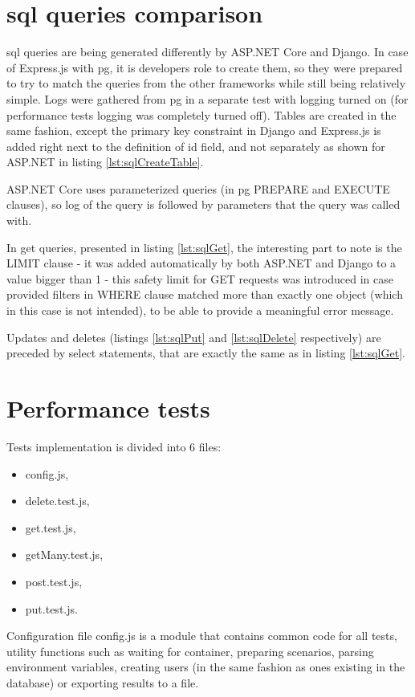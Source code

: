 %
%
\section{\acrshort{sql} queries comparison}
\acrshort{sql} queries are being generated differently by ASP.NET Core and Django. In case of Express.js with \acrlong{pg}, it is developers role to create them, so they were prepared to try to match the queries from the other frameworks while still being relatively simple. Logs were gathered from \acrlong{pg} in a separate test with logging turned on (for performance tests logging was completely turned off).
Tables are created in the same fashion, except the primary key constraint in Django and Express.js is added right next to the definition of id field, and not separately as shown for ASP.NET in listing \ref{lst:sqlCreateTable}.

ASP.NET Core uses parameterized queries (in \acrlong{pg} PREPARE and EXECUTE clauses), so log of the query is followed by parameters that the query was called with.

In get queries, presented in listing \ref{lst:sqlGet}, the interesting part to note is the LIMIT clause - it was added automatically by both ASP.NET and Django to a value bigger than 1 - this safety limit for GET requests was introduced in case provided filters in WHERE clause matched more than exactly one object (which in this case is not intended), to be able to provide a meaningful error message.

Updates and deletes (listings \ref{lst:sqlPut} and \ref{lst:sqlDelete} respectively) are preceded by select statements, that are exactly the same as in listing \ref{lst:sqlGet}.






%
%
\section{Performance tests}
Tests implementation is divided into 6 files:
\begin{itemize}
    \item config.js,
    \item delete.test.js,
    \item get.test.js,
    \item getMany.test.js,
    \item post.test.js,
    \item put.test.js.
\end{itemize}
Configuration file config.js is a module that contains common code for all tests, utility functions such as waiting for container, preparing scenarios, parsing environment variables, creating users (in the same fashion as ones existing in the database) or exporting results to a file.

